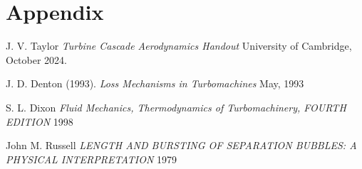 \documentclass{article}
\begin{document}
\section{Appendix}

\begin{thebibliography}{9}


  J. V. Taylor
  \emph{Turbine Cascade Aerodynamics Handout}
  University of Cambridge,
  October 2024.

  J. D. Denton (1993).
  \emph{Loss Mechanisms in Turbomachines}
  May, 1993 

  S. L. Dixon
  \emph{Fluid Mechanics, Thermodynamics of Turbomachinery, FOURTH EDITION}
  1998

  John M. Russell
  \emph{LENGTH AND BURSTING OF SEPARATION BUBBLES: A PHYSICAL INTERPRETATION}
  1979
\end{thebibliography}
\end{document}
